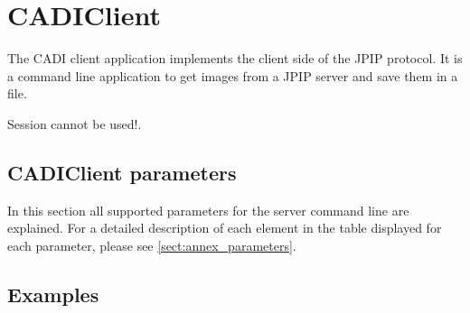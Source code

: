 \documentclass[a4paper,10pt]{article}
\begin{document}
\newpage
\section{CADIClient}
\label{sect:client}

The CADI client application implements the client side of the JPIP protocol. It
is a command line application to get images from a JPIP server and save them
in a file.

Session cannot be used!.

\subsection{CADIClient parameters}
\label{sect:client_parameters}
In this section all supported parameters for the server command line are explained.
For a detailed description of each element in the table displayed for each parameter,
please see \ref{sect:annex_parameters}.




\subsection{Examples}
\label{sect:client_examples}
\end{document}
